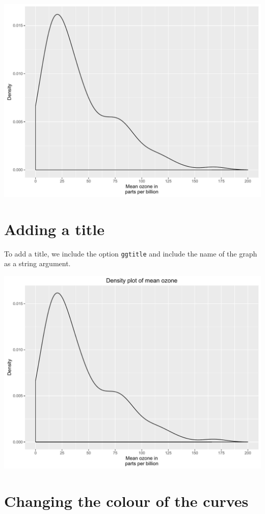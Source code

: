 \begin{center}\includegraphics[width=0.55\linewidth]{figures/density_4-1} \end{center}

\section{Adding a title}\label{adding-a-title-1}

To add a title, we include the option \texttt{ggtitle} and include the
name of the graph as a string argument.

\begin{Shaded}
\begin{Highlighting}[]
\StringTok{ }\StringTok{ }\NormalTok{(}\NormalTok{)}
\end{Highlighting}
\end{Shaded}

\begin{center}\includegraphics[width=0.55\linewidth]{figures/density_5-1} \end{center}

\section{Changing the colour of the
curves}\label{changing-the-colour-of-the-curves}

